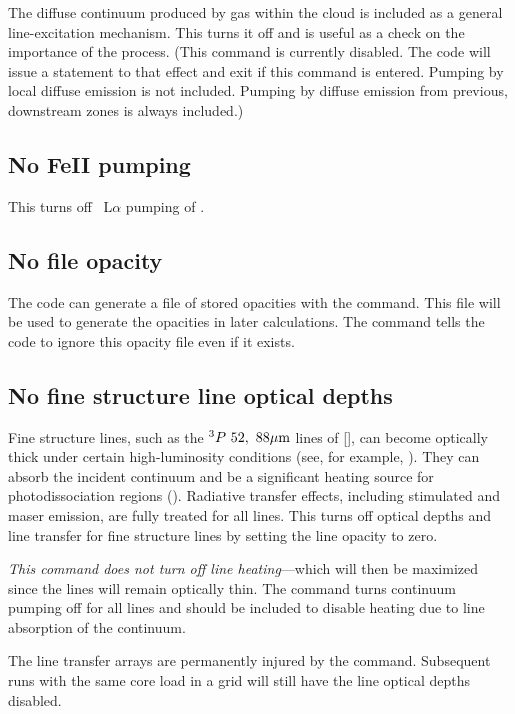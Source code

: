 The diffuse continuum produced by gas within the cloud is included as
a general line-excitation mechanism.
This turns it off and is useful as
a check on the importance of the process.
(This command is currently disabled. The code will issue 
a statement to that effect and exit if this command
is entered.  Pumping by local diffuse emission
is not included.  Pumping by diffuse emission from previous, downstream
zones is always included.)

\subsection{No FeII pumping}

This turns off \hi\ L$\alpha $ pumping of \feii.

\subsection{No file opacity}

The code can generate a file of stored opacities with the
 command.
This file will be used to generate the opacities in later
calculations.
The  command tells the code to ignore this
opacity file even if it exists.

\subsection{No fine structure line optical depths}

Fine structure lines, such as the $^3P\ 52,\ 88 \micron$ lines of [\oiii],
can become optically thick under certain high-luminosity conditions
(see, for example, \citealp{Rubin1983}).
They can absorb the incident continuum and be a significant
heating source for photodissociation regions
(\citealp{Tielens1985a}).
Radiative transfer effects, including stimulated and maser emission, are
fully treated for all lines.
This turns off optical depths and line transfer
for fine structure lines by setting the line opacity to zero.

\emph{This command does not turn off line heating}---which
will then be maximized
since the lines will remain optically thin.
The  command
turns continuum pumping off for all lines
and should be included to disable heating due to line absorption of the
continuum.

The line transfer arrays are permanently injured by the
 command.
Subsequent runs with the same core load in a grid will still have
the line optical depths disabled.

